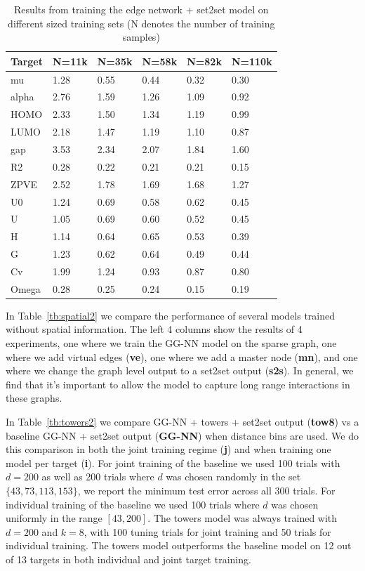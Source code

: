 \documentclass{article}
\begin{document}
\begin{table}[t]
\centering
\caption{Results from training the edge network + set2set model on different sized training sets (N denotes the number of training samples)}
\label{tb:learning_curve}
\begin{tabular}{llllll}
\hline
Target & N=11k & N=35k & N=58k & N=82k & N=110k \\
\hline
mu     & 1.28    & 0.55    & 0.44    & 0.32    & 0.30     \\
alpha  & 2.76    & 1.59    & 1.26    & 1.09    & 0.92     \\
HOMO   & 2.33    & 1.50    & 1.34    & 1.19    & 0.99     \\
LUMO   & 2.18    & 1.47    & 1.19    & 1.10    & 0.87     \\
gap    & 3.53    & 2.34    & 2.07    & 1.84    & 1.60     \\
R2     & 0.28    & 0.22    & 0.21    & 0.21    & 0.15     \\
ZPVE   & 2.52    & 1.78    & 1.69    & 1.68    & 1.27     \\
U0     & 1.24    & 0.69    & 0.58    & 0.62    & 0.45     \\
U      & 1.05    & 0.69    & 0.60    & 0.52    & 0.45     \\
H      & 1.14    & 0.64    & 0.65    & 0.53    & 0.39     \\
G      & 1.23    & 0.62    & 0.64    & 0.49    & 0.44     \\
Cv     & 1.99    & 1.24    & 0.93    & 0.87    & 0.80     \\
Omega  & 0.28    & 0.25    & 0.24    & 0.15    & 0.19    
\end{tabular}
\end{table}



In Table~\ref{tb:spatial2} we compare the performance of several models trained without spatial information. The left 4 columns show the results of 4 experiments, one where we train the GG-NN model on the sparse graph, one where we add virtual edges (\textbf{ve}), one where we add a master node (\textbf{mn}), and one where we change the graph level output to a set2set output (\textbf{s2s}). In general, we find that it's important to allow the model to capture long range interactions in these graphs. 

In Table~\ref{tb:towers2} we compare GG-NN + towers + set2set output (\textbf{tow8}) vs a baseline GG-NN + set2set output (\textbf{GG-NN}) when distance bins are used.  We do this comparison in both the joint training regime (\textbf{j}) and when training one model per target (\textbf{i}). For joint training of the baseline we used 100 trials with $d=200$ as well as 200 trials where $d$ was chosen randomly in the set $\{43, 73, 113, 153\}$, we report the minimum test error across all 300 trials. For individual training of the baseline we used 100 trials where $d$ was chosen uniformly in the range $[43,200]$. The towers model was always trained with $d = 200$ and $k=8$, with 100 tuning trials for joint training and 50 trials for individual training. The towers model outperforms the baseline model on 12 out of 13 targets in both individual and joint target training.
\end{document}
